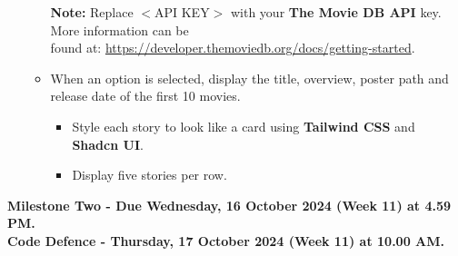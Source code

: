 \documentclass{article}
\begin{document}
\begin{itemize}
\begin{itemize}
\begin{itemize}
	\end{itemize}
	\textbf{Note:} Replace $<$API KEY$>$ with your \textbf{The Movie DB API} key. More information can be \\found at: \href{https://developer.themoviedb.org/docs/getting-started}{https://developer.themoviedb.org/docs/getting-started}.
	\item When an option is selected, display the title, overview, poster path and release date of the first 10 movies.
	\begin{itemize}
		\item Style each story to look like a card using \textbf{Tailwind CSS} and \textbf{Shadcn UI}.
		\item Display five stories per row.
	\end{itemize}
	\end{itemize}
\end{itemize}
	\textbf{Milestone Two - Due Wednesday, 16 October 2024 (Week 11) at 4.59 PM. \\ Code Defence - Thursday, 17 October 2024 (Week 11) at 10.00 AM.}
\end{document}
